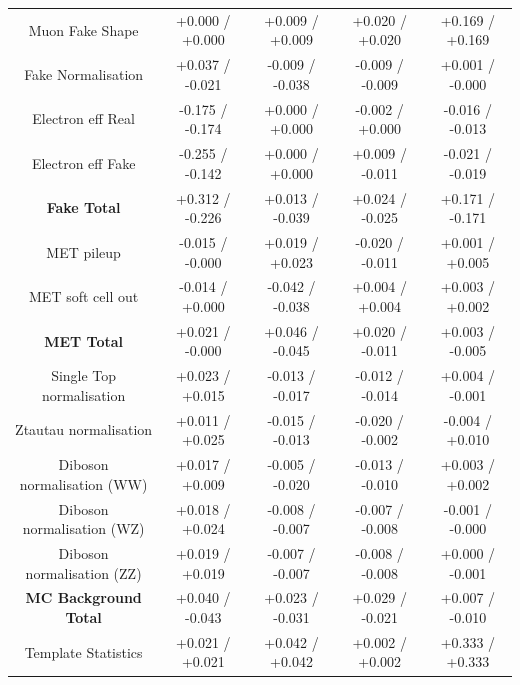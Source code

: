 \begin{table}[htbp]
\begin{center}
\begin{tabular}{|c|c|c|c|c|}
   \hline
   Muon Fake Shape                       &  +0.000   / +0.000   & +0.009   / +0.009   & +0.020   / +0.020   & +0.169   / +0.169   \\
   Fake Normalisation                    &  +0.037   / -0.021   & -0.009   / -0.038   & -0.009   / -0.009   & +0.001   / -0.000   \\
   Electron eff Real                     &  -0.175   / -0.174   & +0.000   / +0.000   & -0.002   / +0.000   & -0.016   / -0.013   \\
   Electron eff Fake                     &  -0.255   / -0.142   & +0.000   / +0.000   & +0.009   / -0.011   & -0.021   / -0.019   \\
   \hline
   \textbf{Fake Total}                   &  +0.312   / -0.226   & +0.013   / -0.039   & +0.024   / -0.025   & +0.171   / -0.171   \\
   \hline
   MET pileup                            &  -0.015   / -0.000   & +0.019   / +0.023   & -0.020   / -0.011   & +0.001   / +0.005   \\
   MET soft cell out                     &  -0.014   / +0.000   & -0.042   / -0.038   & +0.004   / +0.004   & +0.003   / +0.002   \\
   \hline
   \textbf{MET Total}                    &  +0.021   / -0.000   & +0.046   / -0.045   & +0.020   / -0.011   & +0.003   / -0.005   \\
   \hline
   Single Top normalisation              &  +0.023   / +0.015   & -0.013   / -0.017   & -0.012   / -0.014   & +0.004   / -0.001   \\
   Ztautau normalisation                 &  +0.011   / +0.025   & -0.015   / -0.013   & -0.020   / -0.002   & -0.004   / +0.010   \\
   Diboson normalisation (WW)            &  +0.017   / +0.009   & -0.005   / -0.020   & -0.013   / -0.010   & +0.003   / +0.002   \\
   Diboson normalisation (WZ)            &  +0.018   / +0.024   & -0.008   / -0.007   & -0.007   / -0.008   & -0.001   / -0.000   \\
   Diboson normalisation (ZZ)            &  +0.019   / +0.019   & -0.007   / -0.007   & -0.008   / -0.008   & +0.000   / -0.001   \\
   \hline
   \textbf{MC Background Total}          &  +0.040   / -0.043   & +0.023   / -0.031   & +0.029   / -0.021   & +0.007   / -0.010   \\
   \hline
   Template Statistics                   &  +0.021   / +0.021   & +0.042   / +0.042   & +0.002   / +0.002   & +0.333   / +0.333   \\

\end{tabular}
\end{center}
\end{table}
